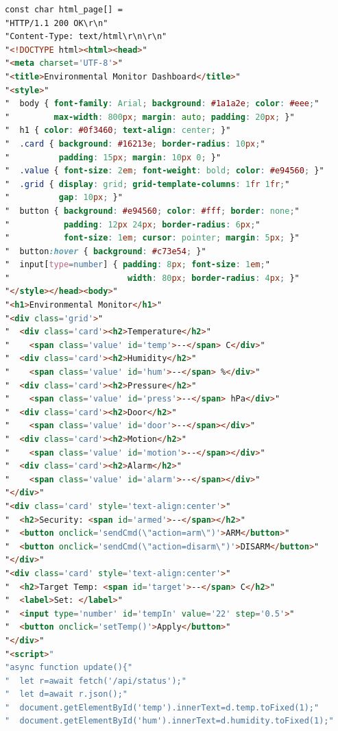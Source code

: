 \documentclass[11pt,a4paper]{article}
\begin{document}
\begin{lstlisting}[language=HTML,
  morekeywords={html,head,meta,title,style,body,div,h1,h2,span,button,input,label,script,
                function,async,await,fetch,document,getElementById,setInterval,
                const,let,true,false,JSON,parseInt,parseFloat}]
const char html_page[] =
"HTTP/1.1 200 OK\r\n"
"Content-Type: text/html\r\n\r\n"
"<!DOCTYPE html><html><head>"
"<meta charset='UTF-8'>"
"<title>Environmental Monitor Dashboard</title>"
"<style>"
"  body { font-family: Arial; background: #1a1a2e; color: #eee;"
"         max-width: 800px; margin: auto; padding: 20px; }"
"  h1 { color: #0f3460; text-align: center; }"
"  .card { background: #16213e; border-radius: 10px;"
"          padding: 15px; margin: 10px 0; }"
"  .value { font-size: 2em; font-weight: bold; color: #e94560; }"
"  .grid { display: grid; grid-template-columns: 1fr 1fr;"
"          gap: 10px; }"
"  button { background: #e94560; color: #fff; border: none;"
"           padding: 12px 24px; border-radius: 6px;"
"           font-size: 1em; cursor: pointer; margin: 5px; }"
"  button:hover { background: #c73e54; }"
"  input[type=number] { padding: 8px; font-size: 1em;"
"                        width: 80px; border-radius: 4px; }"
"</style></head><body>"
"<h1>Environmental Monitor</h1>"
"<div class='grid'>"
"  <div class='card'><h2>Temperature</h2>"
"    <span class='value' id='temp'>--</span> C</div>"
"  <div class='card'><h2>Humidity</h2>"
"    <span class='value' id='hum'>--</span> %</div>"
"  <div class='card'><h2>Pressure</h2>"
"    <span class='value' id='press'>--</span> hPa</div>"
"  <div class='card'><h2>Door</h2>"
"    <span class='value' id='door'>--</span></div>"
"  <div class='card'><h2>Motion</h2>"
"    <span class='value' id='motion'>--</span></div>"
"  <div class='card'><h2>Alarm</h2>"
"    <span class='value' id='alarm'>--</span></div>"
"</div>"
"<div class='card' style='text-align:center'>"
"  <h2>Security: <span id='armed'>--</span></h2>"
"  <button onclick='sendCmd(\"action=arm\")'>ARM</button>"
"  <button onclick='sendCmd(\"action=disarm\")'>DISARM</button>"
"</div>"
"<div class='card' style='text-align:center'>"
"  <h2>Target Temp: <span id='target'>--</span> C</h2>"
"  <label>Set: </label>"
"  <input type='number' id='tempIn' value='22' step='0.5'>"
"  <button onclick='setTemp()'>Apply</button>"
"</div>"
"<script>"
"async function update(){"
"  let r=await fetch('/api/status');"
"  let d=await r.json();"
"  document.getElementById('temp').innerText=d.temp.toFixed(1);"
"  document.getElementById('hum').innerText=d.humidity.toFixed(1);"

\end{lstlisting}
\end{document}
